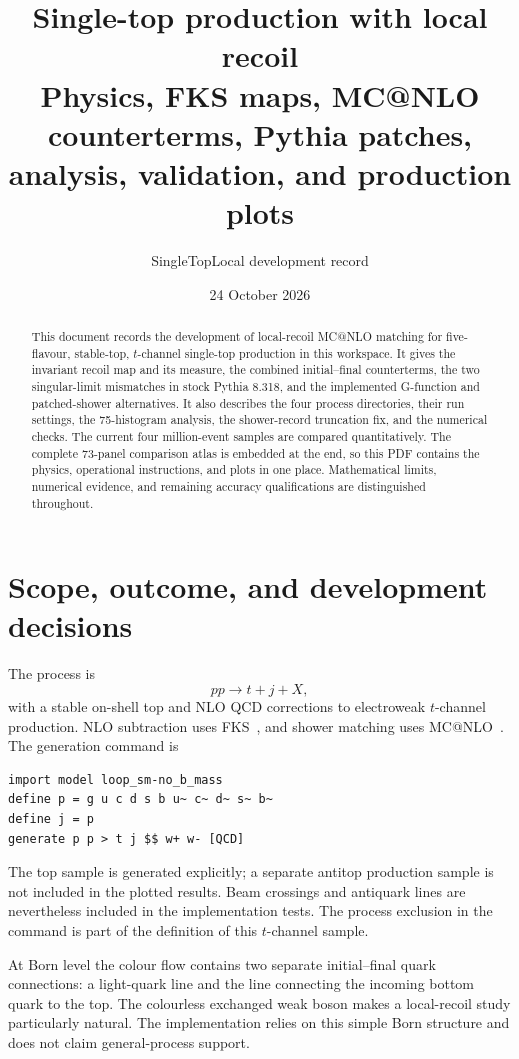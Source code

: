\documentclass[11pt,a4paper]{article}
\title{Single-top production with local recoil\\
\large Physics, FKS maps, MC@NLO counterterms, Pythia patches,\\
analysis, validation, and production plots}
\author{SingleTopLocal development record}
\date{24 October 2026}
\begin{document}
\maketitle
\begin{abstract}
This document records the development of local-recoil MC@NLO matching for
five-flavour, stable-top, $t$-channel single-top production in this workspace.
It gives the invariant recoil map and its measure, the combined initial--final
counterterms, the two singular-limit mismatches in stock Pythia 8.318, and the
implemented G-function and patched-shower alternatives. It also describes the
four process directories, their run settings, the 75-histogram analysis, the
shower-record truncation fix, and the numerical checks. The current four
million-event samples are compared quantitatively. The complete 73-panel
comparison atlas is embedded at the end, so this PDF contains the physics,
operational instructions, and plots in one place. Mathematical limits,
numerical evidence, and remaining accuracy qualifications are distinguished
throughout.
\end{abstract}
\tableofcontents
\clearpage

\section{Scope, outcome, and development decisions}\label{sec:scope}

The process is
\begin{equation}
 p p\longrightarrow t+j+X,
\end{equation}
with a stable on-shell top and NLO QCD corrections to electroweak $t$-channel
production. NLO subtraction uses FKS~\cite{FKS}, and shower matching uses
MC@NLO~\cite{MCatNLO,MG5}. The generation command is
\begin{lstlisting}
import model loop_sm-no_b_mass
define p = g u c d s b u~ c~ d~ s~ b~
define j = p
generate p p > t j $$ w+ w- [QCD]
\end{lstlisting}
The top sample is generated explicitly; a separate antitop production sample
is not included in the plotted results. Beam crossings and antiquark lines
are nevertheless included in the implementation tests. The process exclusion
in the command is part of the definition of this $t$-channel sample.

At Born level the colour flow contains two separate initial--final quark
connections: a light-quark line and the line connecting the incoming bottom
quark to the top. The colourless exchanged weak boson makes a local-recoil
study particularly natural. The implementation relies on this simple Born
structure and does not claim general-process support.
\end{document}
